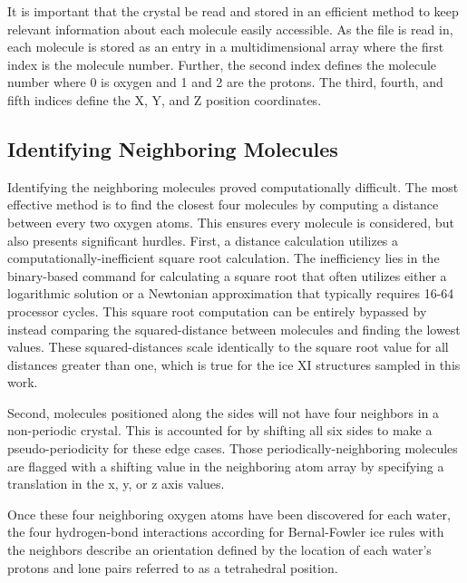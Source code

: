 It is important that the crystal be read and stored in an efficient method to keep relevant information about each molecule easily accessible. 
As the file is read in, each molecule is stored as an entry in a multidimensional array where the first index is the molecule number. 
Further, the second index defines the molecule number where 0 is oxygen and 1 and 2 are the protons. 
The third, fourth, and fifth indices define the X, Y, and Z position coordinates. 

\subsection{Identifying Neighboring Molecules}

Identifying the neighboring molecules proved computationally difficult. 
The most effective method is to find the closest four molecules by computing a distance between every two oxygen atoms.
This ensures every molecule is considered, but also presents significant hurdles.
First, a distance calculation utilizes a computationally-inefficient square root calculation.
The inefficiency lies in the binary-based command for calculating a square root that often utilizes either a logarithmic solution or a Newtonian approximation that typically requires 16-64 processor cycles.
This square root computation can be entirely bypassed by instead comparing the squared-distance between molecules and finding the lowest values.
These squared-distances scale identically to the square root value for all distances greater than one, which is true for the ice XI structures sampled in this work.

Second, molecules positioned along the sides  will not have four neighbors in a non-periodic crystal. 
This is accounted for by shifting all six sides to make a pseudo-periodicity for these edge cases. 
Those periodically-neighboring molecules are flagged with a shifting value in the neighboring atom array by specifying a translation in the x, y, or z axis values. 

Once these four neighboring oxygen atoms have been discovered for each water, the four hydrogen-bond interactions according for Bernal-Fowler ice rules with the neighbors describe an orientation defined by the location of each water's protons and lone pairs referred to as a tetrahedral position.


